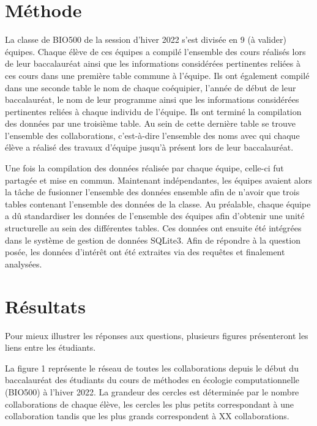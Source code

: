 \documentclass[9pt,twocolumn,twoside,]{pnas-new}
\begin{document}
\hypertarget{muxe9thode}{%
\section{Méthode}\label{muxe9thode}}

La classe de BIO500 de la session d'hiver 2022 s'est divisée en 9 (à
valider) équipes. Chaque élève de ces équipes a compilé l'ensemble des
cours réalisés lors de leur baccalauréat ainsi que les informations
considérées pertinentes reliées à ces cours dans une première table
commune à l'équipe. Ils ont également compilé dans une seconde table le
nom de chaque coéquipier, l'année de début de leur baccalauréat, le nom
de leur programme ainsi que les informations considérées pertinentes
reliées à chaque individu de l'équipe. Ils ont terminé la compilation
des données par une troisième table. Au sein de cette dernière table se
trouve l'ensemble des collaborations, c'est-à-dire l'ensemble des noms
avec qui chaque élève a réalisé des travaux d'équipe jusqu'à présent
lors de leur baccalauréat.

Une fois la compilation des données réalisée par chaque équipe, celle-ci
fut partagée et mise en commun. Maintenant indépendantes, les équipes
avaient alors la tâche de fusionner l'ensemble des données ensemble afin
de n'avoir que trois tables contenant l'ensemble des données de la
classe. Au préalable, chaque équipe a dû standardiser les données de
l'ensemble des équipes afin d'obtenir une unité structurelle au sein des
différentes tables. Ces données ont ensuite été intégrées dans le
système de gestion de données SQLite3. Afin de répondre à la question
posée, les données d'intérêt ont été extraites via des requêtes et
finalement analysées.

\hypertarget{ruxe9sultats}{%
\section{Résultats}\label{ruxe9sultats}}

Pour mieux illustrer les réponses aux questions, plusieurs figures
présenteront les liens entre les étudiants.

La figure 1 représente le réseau de toutes les collaborations depuis le
début du baccalauréat des étudiants du cours de méthodes en écologie
computationnelle (BIO500) à l'hiver 2022. La grandeur des cercles est
déterminée par le nombre collaborations de chaque élève, les cercles les
plus petits correspondant à une collaboration tandis que les plus grands
correspondent à XX collaborations.
\end{document}
